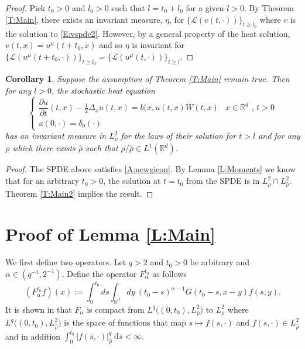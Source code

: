 \documentclass[a4paper,11pt]{article}%
\numberwithin{equation}{section}
\theoremstyle{plain}
\newtheorem{corollary}[theorem]{Corollary}
\theoremstyle{definition}
\newcommand{\R}{\mathbb{R}}
\newcommand{\ud}{\ensuremath{ \mathrm{d} }}
\begin{document}
\begin{proof} Pick $t_0>0$ and $l_0>0$ such that $l=t_0+l_0$ for a given $l >0$.  By Theorem
\ref{T:Main}, there exists an invariant measure, $\eta$, for $\{\mathscr L(v(t,\cdot))\}_{t\ge l_0}$ where $v$ is
the solution to \eqref{E:vspde2}. However, by a general property of the heat solution, $v(t,x)=u^\mu(t+t_0,x)$ and so
$\eta$ is invariant for $\{\mathscr L(u^\mu(t+t_0,\cdot))\}_{t\ge l_0} = \{\mathscr L(u^\mu(t,\cdot))\}_{t\ge
l}$.
\end{proof}

\begin{corollary}
	\label{C:delta}
	Suppose the assumption of Theorem \ref{T:Main} remain true. Then for any $l>0$, the stochastic heat equation
	\begin{equation}
		\label{E:dspde}
		\begin{cases}
		\dfrac{\partial u}{\partial t}(t,x)-\frac{1}{2}\Delta_x u(t,x) = b(x,u(t,x)\dot W(t,x) & \text{$x\in \R^d$ , $t>0$}
		\\ u(0,\cdot) = \delta_0(\cdot)  &
		\end{cases}
	\end{equation}
	has an invariant measure in $L^2_\rho$ for the laws of their solution for $t>l$ and for any $\rho$ which
	there exists $\hat{\rho}$ such that $\rho/\hat{\rho} \in L^1(\R^d)$.
\end{corollary}

\begin{proof}
	The SPDE above satisfies \eqref{A:newgicon}.
	By Lemma \ref{L:Moments} we know that for an arbitrary $t_0>0$, the solution at $t=t_0$ from the SPDE is in $L^2_\rho \cap L^2_{\hat\rho}$. Theorem \ref{T:Main2} implies the result.
\end{proof}

\section{Proof of Lemma \ref{L:Main}}
We first define two operators. Let $q>2$ and $t_0>0$ be arbitrary and $\alpha \in (q^{-1},2^{-1})$. Define the operator $F_\alpha^{t_0}$ as follows
\begin{equation}
	\label{E:fop}
	\left(F_{\alpha}^{t_0} f\right)(x) := \int_0^{t_0} ds \int_{\R^d} dy \: (t_0-s)^{\alpha-1}G(t_0-s,x-y)f(s,y) .
\end{equation}
It is shown in \cite{TessitoreZabczyk98M} that $F_\alpha$ is compact from $L^q\big((0,t_0),L^2_{\hat\rho} \big)$ to
$L^2_\rho$ where $L^q\big((0,t_0),L^2_{\hat\rho} \big)$ is the space of functions that map $s \mapsto f(s,\cdot)$ and
$f(s,\cdot) \in L^2_{\hat\rho}$ and in addition $\int_0^{t_0} |f(s,\cdot)|_{\hat\rho}^q \: \ud s < \infty$.
\end{document}
